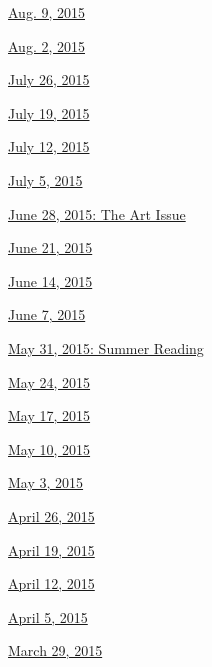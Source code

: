 \href{http://www.nytimes.com/indexes/2015/08/09/books/review/index.html}{Aug.
9, 2015}

\href{http://www.nytimes.com/indexes/2015/08/02/books/review/index.html}{Aug.
2, 2015}

\href{http://www.nytimes.com/indexes/2015/07/26/books/review/index.html}{July
26, 2015}

\href{http://www.nytimes.com/indexes/2015/07/19/books/review/index.html}{July
19, 2015}

\href{http://www.nytimes.com/indexes/2015/07/12/books/review/index.html}{July
12, 2015}

\href{http://www.nytimes.com/indexes/2015/07/05/books/review/index.html}{July
5, 2015}

\href{http://www.nytimes.com/interactive/2015/06/25/books/review/art-issue.html}{June
28, 2015: The Art Issue}

\href{http://www.nytimes.com/indexes/2015/06/21/books/review/index.html}{June
21, 2015}

\href{http://www.nytimes.com/indexes/2015/06/14/books/review/index.html}{June
14, 2015}

\href{http://www.nytimes.com/indexes/2015/06/07/books/review/index.html}{June
7, 2015}

\href{http://www.nytimes.com/indexes/2015/05/31/books/review/index.html}{May
31, 2015: Summer Reading}

\href{http://www.nytimes.com/indexes/2015/05/24/books/review/index.html}{May
24, 2015}

\href{http://www.nytimes.com/indexes/2015/05/17/books/review/index.html}{May
17, 2015}

\href{http://www.nytimes.com/indexes/2015/05/10/books/review/index.html}{May
10, 2015}

\href{http://www.nytimes.com/indexes/2015/05/03/books/review/index.html}{May
3, 2015}

\href{http://www.nytimes.com/indexes/2015/04/26/books/review/index.html}{April
26, 2015}

\href{http://www.nytimes.com/indexes/2015/04/19/books/review/index.html}{April
19, 2015}

\href{http://www.nytimes.com/indexes/2015/04/12/books/review/index.html}{April
12, 2015}

\href{http://www.nytimes.com/indexes/2015/04/05/books/review/index.html}{April
5, 2015}

\href{http://www.nytimes.com/indexes/2015/03/29/books/review/index.html}{March
29, 2015}


